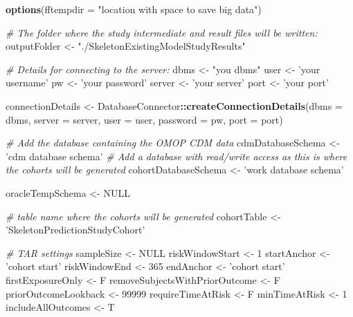 \documentclass[
]{article}
\newenvironment{Shaded}{\begin{snugshade}}{\end{snugshade}}
\newcommand{\CommentTok}[1]{\textcolor[rgb]{0.56,0.35,0.01}{\textit{#1}}}
\newcommand{\DataTypeTok}[1]{\textcolor[rgb]{0.13,0.29,0.53}{#1}}
\newcommand{\DecValTok}[1]{\textcolor[rgb]{0.00,0.00,0.81}{#1}}
\newcommand{\KeywordTok}[1]{\textcolor[rgb]{0.13,0.29,0.53}{\textbf{#1}}}
\newcommand{\NormalTok}[1]{#1}
\newcommand{\OperatorTok}[1]{\textcolor[rgb]{0.81,0.36,0.00}{\textbf{#1}}}
\newcommand{\OtherTok}[1]{\textcolor[rgb]{0.56,0.35,0.01}{#1}}
\newcommand{\StringTok}[1]{\textcolor[rgb]{0.31,0.60,0.02}{#1}}
\begin{document}
\begin{Shaded}
\begin{Highlighting}[]
\KeywordTok{options}\NormalTok{(}\DataTypeTok{fftempdir =} \StringTok{"location with space to save big data"}\NormalTok{)}

\CommentTok{# The folder where the study intermediate and result files will be written:}
\NormalTok{outputFolder <-}\StringTok{ "./SkeletonExistingModelStudyResults"}

\CommentTok{# Details for connecting to the server:}
\NormalTok{dbms <-}\StringTok{ "you dbms"}
\NormalTok{user <-}\StringTok{ 'your username'}
\NormalTok{pw <-}\StringTok{ 'your password'}
\NormalTok{server <-}\StringTok{ 'your server'}
\NormalTok{port <-}\StringTok{ 'your port'}

\NormalTok{connectionDetails <-}\StringTok{ }\NormalTok{DatabaseConnector}\OperatorTok{::}\KeywordTok{createConnectionDetails}\NormalTok{(}\DataTypeTok{dbms =}\NormalTok{ dbms,}
                                                                \DataTypeTok{server =}\NormalTok{ server,}
                                                                \DataTypeTok{user =}\NormalTok{ user,}
                                                                \DataTypeTok{password =}\NormalTok{ pw,}
                                                                \DataTypeTok{port =}\NormalTok{ port)}

\CommentTok{# Add the database containing the OMOP CDM data}
\NormalTok{cdmDatabaseSchema <-}\StringTok{ 'cdm database schema'}
\CommentTok{# Add a database with read/write access as this is where the cohorts will be generated}
\NormalTok{cohortDatabaseSchema <-}\StringTok{ 'work database schema'}

\NormalTok{oracleTempSchema <-}\StringTok{ }\OtherTok{NULL}

\CommentTok{# table name where the cohorts will be generated}
\NormalTok{cohortTable <-}\StringTok{ 'SkeletonPredictionStudyCohort'}

\CommentTok{# TAR settings}
\NormalTok{sampleSize <-}\StringTok{ }\OtherTok{NULL}
\NormalTok{riskWindowStart <-}\StringTok{ }\DecValTok{1}
\NormalTok{startAnchor <-}\StringTok{ 'cohort start'}
\NormalTok{riskWindowEnd <-}\StringTok{ }\DecValTok{365}
\NormalTok{endAnchor <-}\StringTok{ 'cohort start'}
\NormalTok{firstExposureOnly <-}\StringTok{ }\NormalTok{F}
\NormalTok{removeSubjectsWithPriorOutcome <-}\StringTok{ }\NormalTok{F}
\NormalTok{priorOutcomeLookback <-}\StringTok{ }\DecValTok{99999}
\NormalTok{requireTimeAtRisk <-}\StringTok{ }\NormalTok{F}
\NormalTok{minTimeAtRisk <-}\StringTok{ }\DecValTok{1}
\NormalTok{includeAllOutcomes <-}\StringTok{ }\NormalTok{T}



\end{Highlighting}
\end{Shaded}
\end{document}
